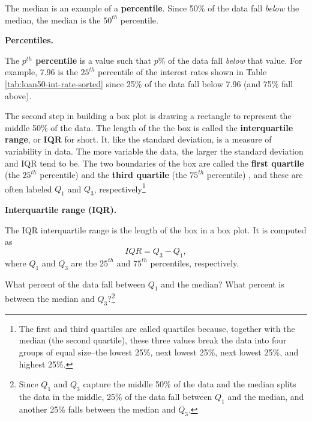 \documentclass[
  10pt,
  openany]{book}
\theoremstyle{definition}
\theoremstyle{definition}
\theoremstyle{definition}
\theoremstyle{definition}
\theoremstyle{remark}
\begin{document}
The median is an example of a \textbf{percentile}. Since 50\% of the data fall \emph{below}
the median, the median is the \(50^{th}\) percentile.

\textbf{Percentiles.}

The \textbf{\(p^{th}\) percentile} is a value such that \(p\)\% of the data fall \emph{below}
that value. For example, 7.96
is the \(25^{th}\) percentile of the interest rates shown in Table \ref{tab:loan50-int-rate-sorted} since 25\% of the data fall below
7.96 (and 75\% fall above).

The second step in building a box plot is drawing a rectangle to represent the
middle 50\% of the data.
The length of the the box is called the \textbf{interquartile range}, or \textbf{IQR} for short.
It, like the standard deviation, is a measure of variability in data.
The more variable the data, the larger the standard deviation and IQR tend to be.
The two boundaries of the box are called the \textbf{first quartile} (the \(25^{th}\) percentile) and the \textbf{third quartile} (the \(75^{th}\) percentile)  , and these are often labeled \(Q_1\) and \(Q_3\), respectively\footnote{The first and third quartiles are called quartiles because, together with the median (the second quartile), these three values break the data into four groups of equal size--the lowest 25\%, next lowest 25\%, next lowest 25\%, and highest 25\%.}

\textbf{Interquartile range (IQR).}

The IQR interquartile range is the length of the box in a box plot.
It is computed as
\[
  IQR = Q_3 - Q_1,
\]
where \(Q_1\) and \(Q_3\) are the \(25^{th}\) and \(75^{th}\) percentiles, respectively.

What percent of the data fall between \(Q_1\) and the median?
What percent is between the median and \(Q_3\)?\footnote{Since \(Q_1\) and \(Q_3\) capture the middle 50\% of the data and the median splits the data in the middle, 25\% of the data fall between \(Q_1\) and the median, and another 25\% falls between the median and \(Q_3\).}
\end{document}
